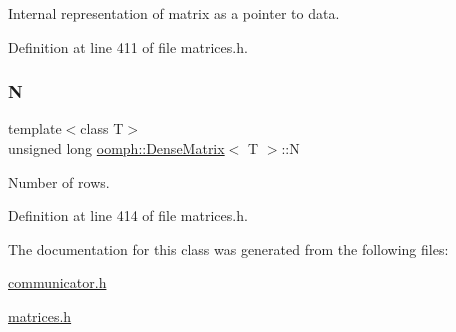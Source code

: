 Internal representation of matrix as a pointer to data. 



Definition at line 411 of file matrices.\+h.

\mbox{\label{classoomph_1_1DenseMatrix_a23cb539be0b4ef0381b9f18e8e50f75e}} 
\subsubsection{\texorpdfstring{N}{N}}
{\footnotesize\ttfamily template$<$class T$>$ \\
unsigned long \hyperlink{classoomph_1_1DenseMatrix}{oomph\+::\+Dense\+Matrix}$<$ T $>$\+::N\hspace{0.3cm}{\ttfamily [protected]}}



Number of rows. 



Definition at line 414 of file matrices.\+h.



The documentation for this class was generated from the following files\+:\begin{DoxyCompactItemize}
\item 
\hyperlink{communicator_8h}{communicator.\+h}\item 
\hyperlink{matrices_8h}{matrices.\+h}\end{DoxyCompactItemize}
